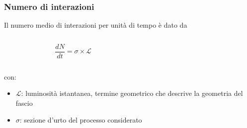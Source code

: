 \documentclass{beamer}
\begin{document}
\begin{frame}[t]
\frametitle{Numero di interazioni}


Il numero medio di interazioni per unit\`a di tempo \`e dato da\\
\medskip

\begin{columns}
\begin{column}{0.4\textwidth}
$$
\frac{dN}{dt} =\sigma \times \mathcal{L}
$$
\end{column}
\begin{column}{0.6\textwidth}
\end{column}
\end{columns}
\medskip
con:\\
\begin{itemize}
\item $\mathcal{L}$: luminosit\`a istantanea, termine geometrico che descrive la geometria del fascio 
\item $\sigma$: sezione d'urto del processo considerato
\end{itemize}

\bigskip 

\end{frame}


\begin{frame}

\end{frame}

\end{document}
